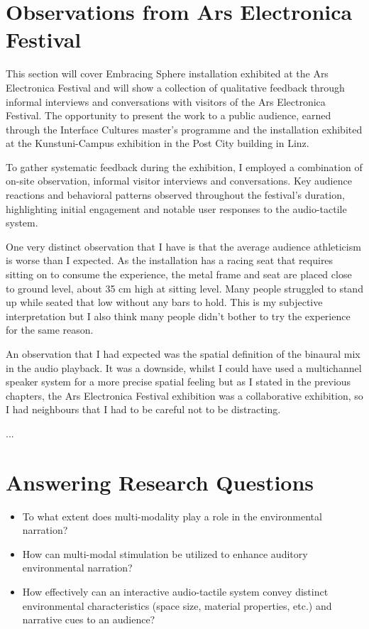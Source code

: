     \section{Observations from Ars Electronica Festival}
        This section will cover Embracing Sphere installation exhibited at the Ars Electronica Festival and will show a collection of qualitative feedback through informal interviews and conversations with visitors of the Ars Electronica Festival. The opportunity to present the work to a public audience, earned through the Interface Cultures master's programme and the installation exhibited at the Kunstuni-Campus exhibition in the Post City building in Linz.\par

        To gather systematic feedback during the exhibition, I employed a combination of on-site observation, informal visitor interviews and conversations. Key audience reactions and behavioral patterns observed throughout the festival’s duration, highlighting initial engagement and notable user responses to the audio-tactile system.\par

        One very distinct observation that I have is that the average audience athleticism is worse than I expected. As the installation has a racing seat that requires sitting on to consume the experience, the metal frame and seat are placed close to ground level, about 35 cm high at sitting level. Many people struggled to stand up while seated that low without any bars to hold. This is my subjective interpretation but I also think many people didn't bother to try the experience for the same reason.\par

        An observation that I had expected was the spatial definition of the binaural mix in the audio playback. It was a downside, whilst I could have used a multichannel speaker system for a more precise spatial feeling but as I stated in the previous chapters, the Ars Electronica Festival exhibition was a collaborative exhibition, so I had neighbours that I had to be careful not to be distracting.\par

        ...\par
    \section{Answering Research Questions}
        \begin{itemize}
            \item To what extent does multi-modality play a role in the environmental narration?
            \item How can multi-modal stimulation be utilized to enhance auditory environmental narration?
            \item How effectively can an interactive audio-tactile system convey distinct environmental characteristics (space size, material properties, etc.) and narrative cues to an audience?
        \end{itemize}

